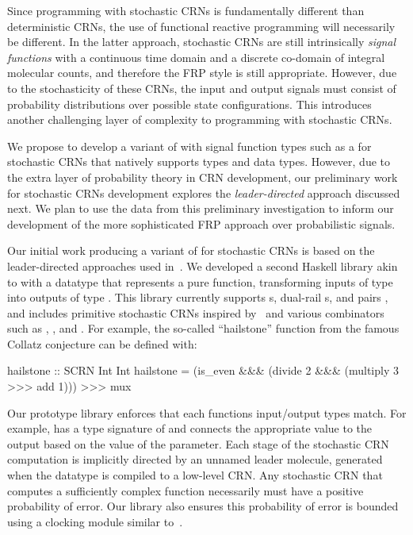 Since programming with stochastic CRNs is fundamentally different than deterministic CRNs, the use of functional reactive programming will necessarily be different.
In the latter approach, stochastic CRNs are still intrinsically \emph{signal functions} with a continuous time domain and a discrete co-domain of integral molecular counts, and therefore the FRP style is still appropriate.
However, due to the stochasticity of these CRNs, the input and output signals must consist of probability distributions over possible state configurations.
This introduces another challenging layer of complexity to programming with stochastic CRNs.

We propose to develop a variant of \reactamole{} with signal function types such as a  for stochastic CRNs that natively supports types  and  data types.
However, due to the extra layer of probability theory in CRN development, our preliminary work for stochastic CRNs development explores the \emph{leader-directed} approach discussed next.
We plan to use the data from this preliminary investigation to inform our development of the more sophisticated FRP approach over probabilistic signals.

Our initial work producing a variant of \reactamole{} for stochastic CRNs is based on the leader-directed approaches used in~\cite{jAnAsEi08,jSCWB08,Doty2018}.
We developed a second Haskell library akin to \reactamole{} with a datatype  that represents a pure function, transforming inputs of type  into outputs of type .
This library currently supports s, dual-rail s, and pairs , and includes primitive stochastic CRNs inspired by~\cite{cChDoSo12} and various combinators such as \hask{>>>}, \hask{&&&}, and \hask{***}.
For example, the so-called ``hailstone'' function from the famous Collatz conjecture can be defined with:
\begin{haskellcode}
hailstone :: SCRN Int Int
hailstone = (is_even &&& (divide 2 &&& (multiply 3 >>> add 1))) >>> mux
\end{haskellcode}
Our prototype library enforces that each functions input/output types match.
For example,  has a type signature of  and connects the appropriate value to the output based on the value of the  parameter.
Each stage of the stochastic CRN computation is implicitly directed by an unnamed leader molecule, generated when the  datatype is compiled to a low-level CRN.
Any stochastic CRN that computes a sufficiently complex function necessarily must have a positive probability of error.
Our library also ensures this probability of error is bounded using a clocking module similar to~\cite{jSCWB08}.

